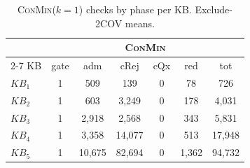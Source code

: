 \begin{table}[t]
\centering
\small
\begin{tabular}{lcccccc}
\toprule
 & \multicolumn{6}{c}{\textsc{ConMin}} \tabularnewline
\cmidrule(lr){2-7}
KB & gate & adm & cRej & cQx & red & tot \tabularnewline
\midrule
$KB_{1}$ & 1 & 509 & 139 & 0 & 78 & 726 \tabularnewline
$KB_{2}$ & 1 & 603 & 3,249 & 0 & 178 & 4,031 \tabularnewline
$KB_{3}$ & 1 & 2,918 & 2,568 & 0 & 343 & 5,831 \tabularnewline
$KB_{4}$ & 1 & 3,358 & 14,077 & 0 & 513 & 17,948 \tabularnewline
$KB_{5}$ & 1 & 10,675 & 82,694 & 0 & 1,362 & 94,732 \tabularnewline
\bottomrule
\end{tabular}
\caption{\textsc{ConMin}($k{=}1$) checks by phase per KB. Exclude-2COV means.}
\label{tab:app-checks}
\end{table}
